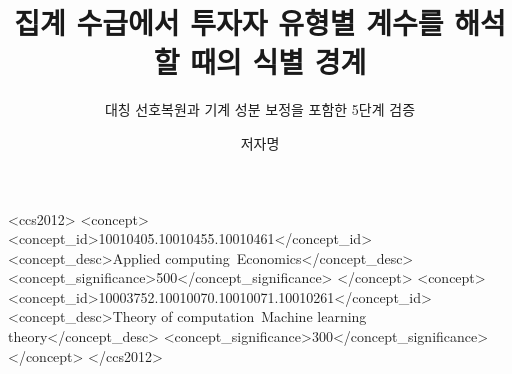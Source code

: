 \documentclass[sigconf,nonacm]{acmart}
\begin{document}
\title{집계 수급에서 투자자 유형별 계수를 해석할 때의 식별 경계}
\subtitle{대칭 선호복원과 기계 성분 보정을 포함한 5단계 검증}

\author{저자명}
\renewcommand{\shortauthors}{저자명}

\begin{CCSXML}
<ccs2012>
<concept>
<concept_id>10010405.10010455.10010461</concept_id>
<concept_desc>Applied computing~Economics</concept_desc>
<concept_significance>500</concept_significance>
</concept>
<concept>
<concept_id>10003752.10010070.10010071.10010261</concept_id>
<concept_desc>Theory of computation~Machine learning theory</concept_desc>
<concept_significance>300</concept_significance>
</concept>
</ccs2012>
\end{CCSXML}



\maketitle





\end{document}
